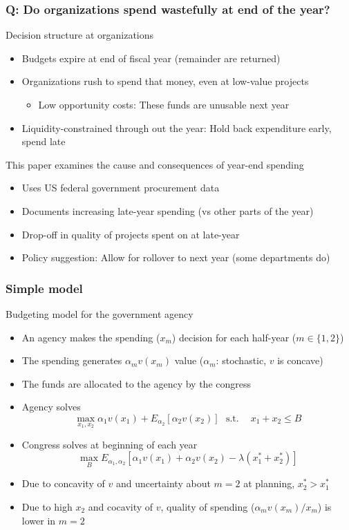 \documentclass[aspectratio=169]{beamer}
\begin{document}
\begin{frame}
\frametitle{Q: Do organizations spend wastefully at end of the year?} 
Decision structure at organizations
\begin{itemize}\setlength\itemsep{3pt}
\item Budgets expire at end of fiscal year (remainder are returned)
\item Organizations rush to spend that money, even at low-value projects
\begin{itemize}\setlength\itemsep{3pt}
  \item Low opportunity costs: These funds are unusable next year
\end{itemize}
\item Liquidity-constrained through out the year: Hold back expenditure early, spend late
\end{itemize}\medskip
This paper examines the cause and consequences of year-end spending
\begin{itemize}\setlength\itemsep{3pt}
\item Uses US federal government procurement data
\item Documents increasing late-year spending (vs other parts of the year)
\item Drop-off in quality of projects spent on at late-year
\item Policy suggestion: Allow for rollover to next year (some departments do)
\end{itemize}
\end{frame}

\begin{frame}
\frametitle{Simple model} 
Budgeting model for the government agency
\begin{itemize}\setlength\itemsep{3pt}
\item An agency makes the spending ($x_m$) decision  for each half-year ($m\in\{1,2\}$)
\item The spending generates $\alpha_m v(x_m)$ value ($\alpha_m$: stochastic, $v$ is concave)
\item The funds are allocated to the agency by the congress
\item Agency solves 
\[
\max_{x_1,x_2} \alpha_1 v(x_1)+E_{\alpha_2}[\alpha_2 v(x_2)] \ \ \   \text{s.t. }\ \ \ \ x_1+x_2\leq B
\]
\item Congress solves at beginning of each year
\[
\max_B E_{\alpha_1, \alpha_2}[\alpha_1 v(x_1)+\alpha_2 v(x_2)-\lambda(x_1^*+x_2^*)]
\]
\item Due to concavity of $v$ and uncertainty about $m=2$ at planning, $x_2^*>x_1^*$
\item Due to high $x_2$ and cocavity of $v$, quality of spending ($\alpha_mv(x_m)/x_m$) is lower in $m=2$
\end{itemize}\medskip
\end{frame}
\end{document}
